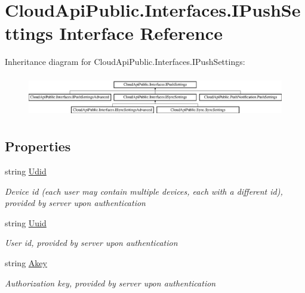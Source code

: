 \hypertarget{interface_cloud_api_public_1_1_interfaces_1_1_i_push_settings}{\section{Cloud\-Api\-Public.\-Interfaces.\-I\-Push\-Settings Interface Reference}
\label{interface_cloud_api_public_1_1_interfaces_1_1_i_push_settings}
}
Inheritance diagram for Cloud\-Api\-Public.\-Interfaces.\-I\-Push\-Settings\-:\begin{figure}[H]
\begin{center}
\leavevmode
\includegraphics[height=1.836066cm]{interface_cloud_api_public_1_1_interfaces_1_1_i_push_settings}
\end{center}
\end{figure}
\subsection*{Properties}
\begin{DoxyCompactItemize}
\item 
string \hyperlink{interface_cloud_api_public_1_1_interfaces_1_1_i_push_settings_a959eb97596da80de2ceca9f042ce6ae8}{Udid}
\begin{DoxyCompactList}\small\item\em Device id (each user may contain multiple devices, each with a different id), provided by server upon authentication \end{DoxyCompactList}\item 
string \hyperlink{interface_cloud_api_public_1_1_interfaces_1_1_i_push_settings_aa7bd7078a4563c343168024933fa1d98}{Uuid}
\begin{DoxyCompactList}\small\item\em User id, provided by server upon authentication \end{DoxyCompactList}\item 
string \hyperlink{interface_cloud_api_public_1_1_interfaces_1_1_i_push_settings_abfa1e9703bcce312750e8fdb2e042186}{Akey}
\begin{DoxyCompactList}\small\item\em Authorization key, provided by server upon authentication \end{DoxyCompactList}\end{DoxyCompactItemize}


